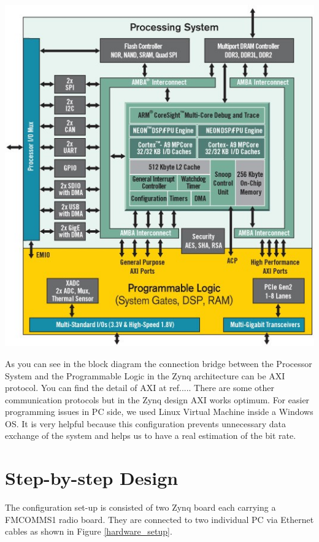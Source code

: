 \begin{center}
\includegraphics[width=\textwidth]{content/fig/zynq_inside.JPG}
\label{design_block_diagram}
\end{center}

As you can see in the block diagram the connection bridge between the Processor System and the Programmable Logic in the Zynq architecture can be AXI protocol. You can find the detail of AXI at ref..... There are some other communication protocols but in the Zynq design AXI works optimum.
For easier programming issues in PC side, we used Linux Virtual Machine inside a Windows OS. It is very helpful because this configuration prevents unnecessary data exchange of the system and helps us to have a real estimation of the bit rate.\\

\section{Step-by-step Design}
The configuration set-up is consisted of two Zynq board each carrying a FMCOMMS1 radio board. They are connected to two individual PC via Ethernet cables as shown in Figure \ref{hardware_setup}.\\

